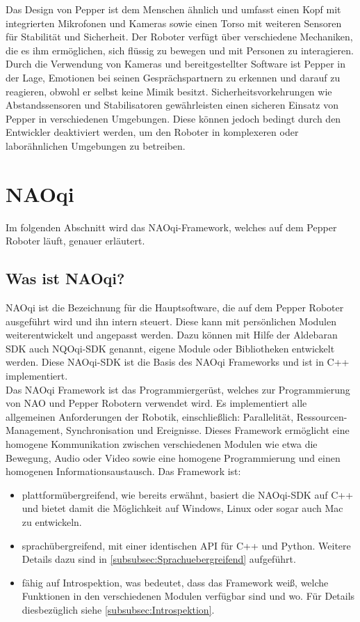 Das Design von Pepper ist dem Menschen ähnlich und umfasst einen Kopf mit integrierten Mikrofonen und Kameras sowie einen Torso mit weiteren Sensoren für Stabilität und Sicherheit. Der Roboter verfügt über verschiedene Mechaniken, die es ihm ermöglichen, sich flüssig zu bewegen und mit Personen zu interagieren. Durch die Verwendung von Kameras und bereitgestellter Software ist Pepper in der Lage, Emotionen bei seinen Gesprächspartnern zu erkennen und darauf zu reagieren, obwohl er selbst keine Mimik besitzt. Sicherheitsvorkehrungen wie Abstandssensoren und Stabilisatoren gewährleisten einen sicheren Einsatz von Pepper in verschiedenen Umgebungen. Diese können jedoch bedingt durch den Entwickler deaktiviert werden, um den Roboter in komplexeren oder laborähnlichen Umgebungen zu betreiben.\\


\section{NAOqi}\label{sec:NAOqi}
Im folgenden Abschnitt wird das NAOqi-Framework, welches auf dem Pepper Roboter läuft, genauer erläutert.\\

\subsection{Was ist NAOqi?}\label{subsec:WasIstNAOqi}
NAOqi ist die Bezeichnung für die Hauptsoftware, die auf dem Pepper Roboter ausgeführt wird und ihn intern steuert. Diese kann mit persönlichen Modulen weiterentwickelt und angepasst werden. Dazu können mit Hilfe der Aldebaran \ac{SDK} auch NQOqi-\ac{SDK} genannt, eigene Module oder Bibliotheken entwickelt werden. Diese NAOqi-\ac{SDK} ist die Basis des NAOqi Frameworks und ist in C++ implementiert\cite{nao_dev_install_guide}.\\
Das NAOqi Framework ist das Programmiergerüst, welches zur Programmierung von NAO und Pepper Robotern verwendet wird. Es implementiert alle allgemeinen Anforderungen der Robotik, einschließlich: Parallelität, Ressourcen-Management, Synchronisation und Ereignisse. Dieses Framework ermöglicht eine homogene Kommunikation zwischen verschiedenen Modulen wie etwa die Bewegung, Audio oder Video sowie eine homogene Programmierung und einen homogenen Informationsaustausch. Das Framework ist:\\
\begin{itemize}
    \item plattformübergreifend, wie bereits erwähnt, basiert die NAOqi-\ac{SDK} auf C++ und bietet damit die Möglichkeit auf Windows, Linux oder sogar auch Mac zu entwickeln.
    \item sprachübergreifend, mit einer identischen API für C++ und Python. Weitere Details dazu sind in \autoref{subsubsec:Sprachuebergreifend} aufgeführt.
    \item fähig auf Introspektion, was bedeutet, dass das Framework weiß, welche Funktionen in den verschiedenen Modulen verfügbar sind und wo. Für Details diesbezüglich siehe \autoref{subsubsec:Introspektion}.
\end{itemize}

